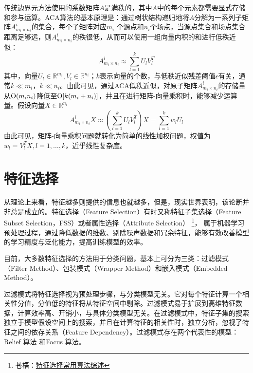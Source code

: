 传统边界元方法使用的系数矩阵$A$是满秩的，其中$A$中的每个元素都需要显式存储和参与运算。ACA算法的基本原理是：通过树状结构递归地将$A$分解为一系列子矩阵$A_{m_i\times n_i}^i$的集合，每个子矩阵对应$m_i$ 个源点和$n_i$个场点，当源点集合和场点集合距离足够远，则$A_{m_i\times n_i}^i$的秩很低，从而可以使用一组向量内积的和进行低秩近似：
\begin{equation}\label{eq:aca}
  A_{m_i\times n_i}^i \approx \sum_{l=1}^k{U_lV_l^T}
\end{equation}
其中，向量$U_l\in \mathbb R^{m_i},V_l\in \mathbb R^{n_i}$；$k$表示向量的个数，与低秩近似残差阈值$\epsilon$有关，通常$k\ll m_i$，$k\ll n_i$。由此可见，通过ACA低秩近似，对原子矩阵$A_{m_i\times n_i}^i$的存储量从$\operatorname{\mathrm{O}}(m_i n_i)$降低至$\operatorname{\mathrm{O}}[k(m_i + n_i)]$，并且在进行矩阵-向量乘积时，能够减少运算量。假设向量$X\in \mathbb R^{n_i}$
\begin{equation}
  A_{m_i\times n_i}^i X \approx (\sum_{l=1}^k{U_lV_l^T})X = \sum_{l=1}^k{w_lU_l}
\end{equation}
由此可见，矩阵-向量乘积问题就转化为简单的线性加权问题，权值为$w_l = V_l^TX,l=1,\ldots,k$，近乎线性复杂度。

\section{特征选择}
从理论上来看，特征越多则提供的信息也就越多，但是，现实世界表明，该论断并非总是成立的。特征选择（Feature Selection）有时又称特征子集选择（Feature Subset Selection，FSS）或者属性选择（Attribute Selection）
\footnote{苍梧：\href{http://www.cnblogs.com/heaad/archive/2011/01/02/1924088.html}{特征选择常用算法综述}}，
属于机器学习预处理过程，通过降低数据的维数、剔除噪声数据和冗余特征，能够有效改善模型的学习精度与泛化能力，提高训练模型的效率。


目前，大多数特征选择的方法用于分类问题，基本上可分为三类\cite{guyon2003introduction}：过滤模式（Filter Method）\cite{mladenic1999feature}、包装模式（Wrapper Method）\cite{breiman1984classification}和嵌入模式（Embedded Method）\cite{kohavi1997wrappers}。

过滤模式将特征选择视为预处理步骤，与分类模型无关。它对每个特征计算一个相关性分值，分值低的特征将从特征空间中剔除。过滤模式易于扩展到高维特征数据，计算效率高、开销小，与具体分类模型无关。在过滤模式中，特征子集的搜索独立于模型假设空间上的搜索，并且在计算特征的相关性时，独立分析，忽视了特征之间的依存关系（Feature Dependency）。过滤模式存在两个代表性的模型：Relief 算法\cite{kira1992practical} 和Focus 算法\cite{almuallim1991learning}。

